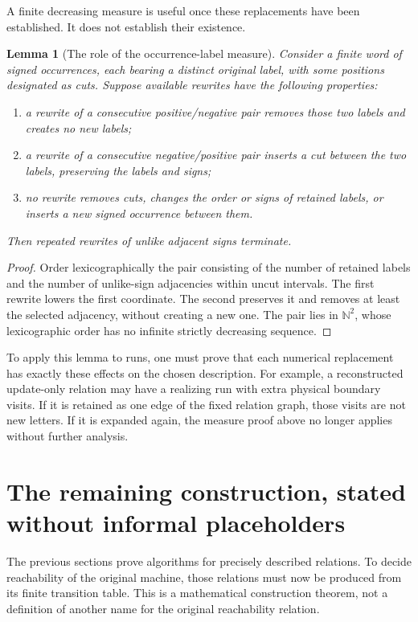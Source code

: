\documentclass[11pt,a4paper]{article}
\newtheorem{lemma}[theorem]{Lemma}
\theoremstyle{definition}
\theoremstyle{remark}
\newcommand{\N}{\mathbb N}
\begin{document}
A finite decreasing measure is useful once these replacements have
been established. It does not establish their existence.

\begin{lemma}[The role of the occurrence-label measure]
\label{lem:normal-measure}
Consider a finite word of signed occurrences, each bearing a distinct
original label, with some positions designated as cuts. Suppose
available rewrites have the following properties:
\begin{enumerate}[leftmargin=*]
\item a rewrite of a consecutive positive/negative pair removes
      those two labels and creates no new labels;
\item a rewrite of a consecutive negative/positive pair inserts a
      cut between the two labels, preserving the labels and signs;
\item no rewrite removes cuts, changes the order or signs of retained
      labels, or inserts a new signed occurrence between them.
\end{enumerate}
Then repeated rewrites of unlike adjacent signs terminate.
\end{lemma}
\begin{proof}
Order lexicographically the pair consisting of the number of
retained labels and the number of unlike-sign adjacencies within
uncut intervals. The first rewrite lowers the first coordinate.
The second preserves it and removes at least the selected adjacency,
without creating a new one. The pair lies in \(\N^2\), whose
lexicographic order has no infinite strictly decreasing sequence.
\end{proof}

To apply this lemma to runs, one must prove that each numerical
replacement has exactly these effects on the chosen description.
For example, a reconstructed update-only relation may have a
realizing run with extra physical boundary visits. If it is retained
as one edge of the fixed relation graph, those visits are not new
letters. If it is expanded again, the measure proof above no longer
applies without further analysis.



\section{The remaining construction, stated without informal placeholders}
\label{sec:construction}

The previous sections prove algorithms for precisely described
relations. To decide reachability of the original machine, those
relations must now be produced from its finite transition table.
This is a mathematical construction theorem, not a definition of
another name for the original reachability relation.
\end{document}
